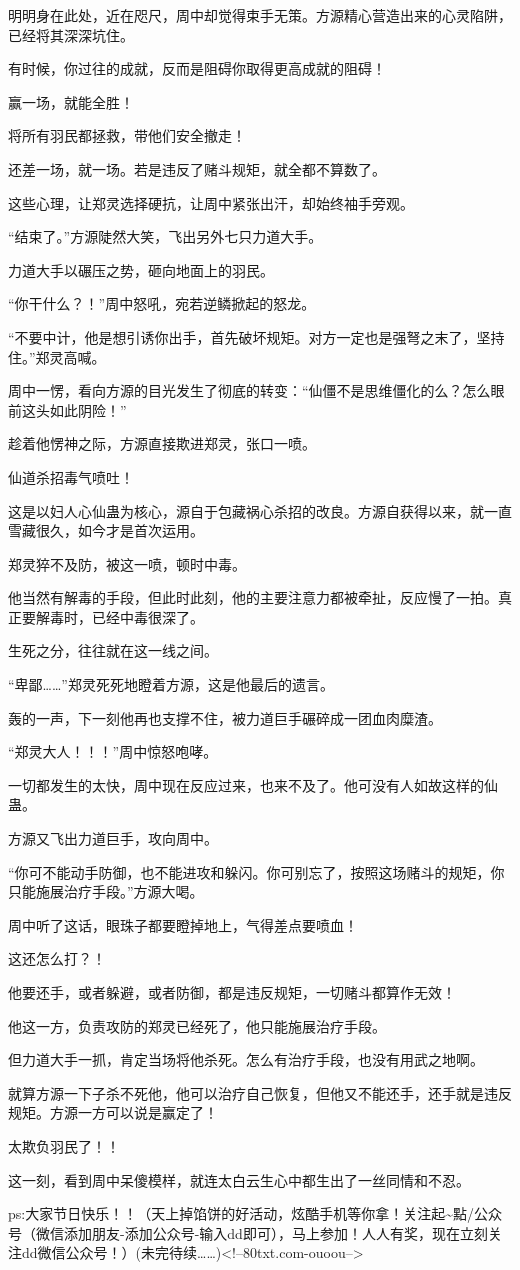 \begin{this_body}
明明身在此处，近在咫尺，周中却觉得束手无策。方源精心营造出来的心灵陷阱，已经将其深深坑住。

有时候，你过往的成就，反而是阻碍你取得更高成就的阻碍！

赢一场，就能全胜！

将所有羽民都拯救，带他们安全撤走！

还差一场，就一场。若是违反了赌斗规矩，就全都不算数了。

这些心理，让郑灵选择硬抗，让周中紧张出汗，却始终袖手旁观。

“结束了。”方源陡然大笑，飞出另外七只力道大手。

力道大手以碾压之势，砸向地面上的羽民。

“你干什么？！”周中怒吼，宛若逆鳞掀起的怒龙。

“不要中计，他是想引诱你出手，首先破坏规矩。对方一定也是强弩之末了，坚持住。”郑灵高喊。

周中一愣，看向方源的目光发生了彻底的转变：“仙僵不是思维僵化的么？怎么眼前这头如此阴险！”

趁着他愣神之际，方源直接欺进郑灵，张口一喷。

仙道杀招毒气喷吐！

这是以妇人心仙蛊为核心，源自于包藏祸心杀招的改良。方源自获得以来，就一直雪藏很久，如今才是首次运用。

郑灵猝不及防，被这一喷，顿时中毒。

他当然有解毒的手段，但此时此刻，他的主要注意力都被牵扯，反应慢了一拍。真正要解毒时，已经中毒很深了。

生死之分，往往就在这一线之间。

“卑鄙……”郑灵死死地瞪着方源，这是他最后的遗言。

轰的一声，下一刻他再也支撑不住，被力道巨手碾碎成一团血肉糜渣。

“郑灵大人！！！”周中惊怒咆哮。

一切都发生的太快，周中现在反应过来，也来不及了。他可没有人如故这样的仙蛊。

方源又飞出力道巨手，攻向周中。

“你可不能动手防御，也不能进攻和躲闪。你可别忘了，按照这场赌斗的规矩，你只能施展治疗手段。”方源大喝。

周中听了这话，眼珠子都要瞪掉地上，气得差点要喷血！

这还怎么打？！

他要还手，或者躲避，或者防御，都是违反规矩，一切赌斗都算作无效！

他这一方，负责攻防的郑灵已经死了，他只能施展治疗手段。

但力道大手一抓，肯定当场将他杀死。怎么有治疗手段，也没有用武之地啊。

就算方源一下子杀不死他，他可以治疗自己恢复，但他又不能还手，还手就是违反规矩。方源一方可以说是赢定了！

太欺负羽民了！！

这一刻，看到周中呆傻模样，就连太白云生心中都生出了一丝同情和不忍。

ps:大家节日快乐！！（天上掉馅饼的好活动，炫酷手机等你拿！关注起\~{}點/公众号（微信添加朋友-添加公众号-输入dd即可），马上参加！人人有奖，现在立刻关注dd微信公众号！）(未完待续……)<!--80txt.com-ouoou-->

\end{this_body}

